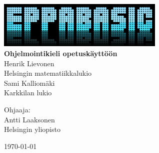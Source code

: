 \begin{titlepage}
	\begin{center}
		\vspace*{\fill}
	
		\includegraphics[width=0.6\textwidth]{logo}~\\[1cm]
		
		{\huge \bfseries Ohjelmointikieli opetuskäyttöön} \\[0.4cm]
		
		{\Large Henrik Lievonen\\
		Helsingin matematiikkalukio\\
		Sami Kalliomäki\\
		Karkkilan lukio}
		
		{\large Ohjaaja:\\
		Antti Laaksonen\\
		Helsingin yliopisto}
		
		{\large \today}
		
		\vfill		
	\end{center}
\end{titlepage}
